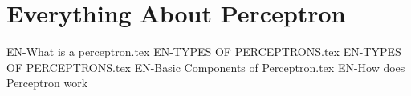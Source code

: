 \chapterspaceabove{6.75cm} %
\chapterspacebelow{7.25cm} %


\chapter{Everything About Perceptron}

{EN-What is a perceptron.tex}
{EN-TYPES OF PERCEPTRONS.tex}
{EN-TYPES OF PERCEPTRONS.tex}
{EN-Basic Components of Perceptron.tex}
{EN-How does Perceptron work}